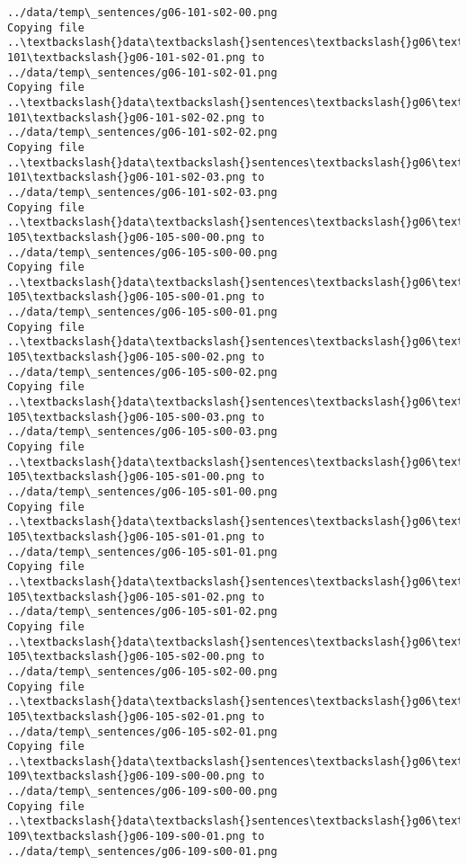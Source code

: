 \documentclass[11pt]{article}
\begin{document}
\begin{Verbatim}[commandchars=\\\{\}]
../data/temp\_sentences/g06-101-s02-00.png
Copying file ..\textbackslash{}data\textbackslash{}sentences\textbackslash{}g06\textbackslash{}g06-101\textbackslash{}g06-101-s02-01.png to
../data/temp\_sentences/g06-101-s02-01.png
Copying file ..\textbackslash{}data\textbackslash{}sentences\textbackslash{}g06\textbackslash{}g06-101\textbackslash{}g06-101-s02-02.png to
../data/temp\_sentences/g06-101-s02-02.png
Copying file ..\textbackslash{}data\textbackslash{}sentences\textbackslash{}g06\textbackslash{}g06-101\textbackslash{}g06-101-s02-03.png to
../data/temp\_sentences/g06-101-s02-03.png
Copying file ..\textbackslash{}data\textbackslash{}sentences\textbackslash{}g06\textbackslash{}g06-105\textbackslash{}g06-105-s00-00.png to
../data/temp\_sentences/g06-105-s00-00.png
Copying file ..\textbackslash{}data\textbackslash{}sentences\textbackslash{}g06\textbackslash{}g06-105\textbackslash{}g06-105-s00-01.png to
../data/temp\_sentences/g06-105-s00-01.png
Copying file ..\textbackslash{}data\textbackslash{}sentences\textbackslash{}g06\textbackslash{}g06-105\textbackslash{}g06-105-s00-02.png to
../data/temp\_sentences/g06-105-s00-02.png
Copying file ..\textbackslash{}data\textbackslash{}sentences\textbackslash{}g06\textbackslash{}g06-105\textbackslash{}g06-105-s00-03.png to
../data/temp\_sentences/g06-105-s00-03.png
Copying file ..\textbackslash{}data\textbackslash{}sentences\textbackslash{}g06\textbackslash{}g06-105\textbackslash{}g06-105-s01-00.png to
../data/temp\_sentences/g06-105-s01-00.png
Copying file ..\textbackslash{}data\textbackslash{}sentences\textbackslash{}g06\textbackslash{}g06-105\textbackslash{}g06-105-s01-01.png to
../data/temp\_sentences/g06-105-s01-01.png
Copying file ..\textbackslash{}data\textbackslash{}sentences\textbackslash{}g06\textbackslash{}g06-105\textbackslash{}g06-105-s01-02.png to
../data/temp\_sentences/g06-105-s01-02.png
Copying file ..\textbackslash{}data\textbackslash{}sentences\textbackslash{}g06\textbackslash{}g06-105\textbackslash{}g06-105-s02-00.png to
../data/temp\_sentences/g06-105-s02-00.png
Copying file ..\textbackslash{}data\textbackslash{}sentences\textbackslash{}g06\textbackslash{}g06-105\textbackslash{}g06-105-s02-01.png to
../data/temp\_sentences/g06-105-s02-01.png
Copying file ..\textbackslash{}data\textbackslash{}sentences\textbackslash{}g06\textbackslash{}g06-109\textbackslash{}g06-109-s00-00.png to
../data/temp\_sentences/g06-109-s00-00.png
Copying file ..\textbackslash{}data\textbackslash{}sentences\textbackslash{}g06\textbackslash{}g06-109\textbackslash{}g06-109-s00-01.png to
../data/temp\_sentences/g06-109-s00-01.png

\end{Verbatim}
\end{document}
